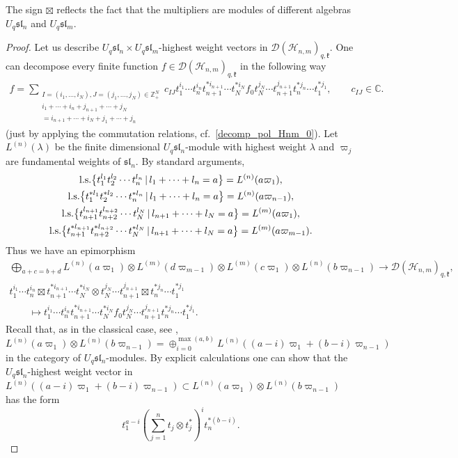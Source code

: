 \documentclass[pdftex]{sigma}
\begin{document}
\begin{remark}
The sign $\boxtimes$ ref\/lects the fact that the multipliers are modules of dif\/ferent algebras $U_q
\mathfrak{sl}_n$ and $U_q \mathfrak{sl}_m$.
\end{remark}

\begin{proof} Let us describe $U_q \mathfrak{sl}_n \times U_q \mathfrak{sl}_m$-highest weight vectors in
$\mathscr{D}(\mathscr{H}_{n,m})_{q,\mathfrak{k}}$. One can decompose every f\/inite function $f \in
\mathscr{D}(\mathscr{H}_{n,m})_{q,\mathfrak{k}}$ in the following way
\begin{gather*}
f= \sum_{\substack{I=(i_1,\ldots,i_N), J=(j_1,\ldots,j_N) \in \mathbb Z_+^N \\ i_1+\cdots +
i_n+j_{n+1}+\cdots +j_N\\ = i_{n+1}+\cdots+i_N+j_1+\cdots +j_n}} \!\!\!\!\!c_{IJ}t_1^{i_1}\cdots
t_n^{i_n}t_{n+1}^{*i_{n+1}}\cdots t_N^{*i_N}f_0t_N^{j_N}\cdots t_{n+1}^{j_{n+1}}t_n^{*j_n}\cdots t_1^{*j_1},
\qquad c_{IJ} \in \mathbb C.
\end{gather*}
(just by applying the commutation relations, cf.~\eqref{decomp_pol_Hnm_0}). Let $L^{(n)}(\lambda)$ be the
f\/inite dimensional $U_q \mathfrak{sl}_n$-module with highest weight $\lambda$ and $\varpi_j$ are fundamental
weights of $\mathfrak{sl}_n$. By standard arguments,
\begin{gather*}
 {\rm l.s.}\big\{t_1^{l_1}t_2^{l_2}\cdots t_n^{l_n}\,|\,l_1+\cdots+l_n=a\big\}=L^{(n)}(a\varpi_1),
\\  {\rm l.s.}\big\{t_1^{*l_1}t_2^{*l_2}\cdots t_n^{*l_n}\,|\,l_1+\cdots+l_n=a\big\}=L^{(n)}(a\varpi_{n-1}),
\\  {\rm l.s.}\big\{t_{n+1}^{l_{n+1}}t_{n+2}^{l_{n+2}}\cdots t_N^{l_N}\,|\, l_{n+1}+\cdots+l_N=a\big\}=L^{(m)}(a\varpi_1),
\\  {\rm l.s.}\big\{t_{n+1}^{*l_{n+1}}t_{n+2}^{*l_{n+2}}\cdots
t_N^{*l_N}\,|\,l_{n+1}+\cdots+l_N=a\big\}=L^{(m)}(a\varpi_{m-1}).
\end{gather*}
Thus we have an epimorphism
\begin{gather*}
\bigoplus_{a+c=b+d} L^{(n)}(a\varpi_1) \otimes  L^{(m)}(d\varpi_{m-1}) \otimes L^{(m)}(c\varpi_1) \otimes
L^{(n)}(b\varpi_{n-1}) \rightarrow \mathscr{D}(\mathscr{H}_{n,m})_{q,\mathfrak{k}},
\\
t_1^{i_1}\cdots t_n^{i_n} \boxtimes t_{n+1}^{*i_{n+1}}\cdots t_N^{*i_N} \otimes t_N^{j_N}\cdots
t_{n+1}^{j_{n+1}} \boxtimes t_n^{*j_n}\cdots t_1^{*j_1}\\
\qquad{} \mapsto t_1^{i_1}\cdots t_n^{i_n}
t_{n+1}^{*i_{n+1}}\cdots t_N^{*i_N}f_0t_N^{j_N}\cdots t_{n+1}^{j_{n+1}}t_n^{*j_n}\cdots t_1^{*j_1}.
\end{gather*}
Recall that, as in the classical case, see \cite{VO},
\[
L^{(n)}(a\varpi_1) \otimes L^{(n)}(b\varpi_{n-1}) = \oplus_{i=0}^{\max(a,b)}
L^{(n)}((a-i)\varpi_1+(b-i)\varpi_{n-1})
\]
in the category of $U_q \mathfrak{sl}_n$-modules. By explicit calculations one can show that the $U_q
\mathfrak{sl}_n$-highest weight vector in $L^{(n)}((a-i)\varpi_1+(b-i)\varpi_{n-1}) \subset
L^{(n)}(a\varpi_1) \otimes L^{(n)}(b\varpi_{n-1})$ has the form
\[
t_1^{a-i}  \left(\sum_{j=1}^nt_j
\otimes t_j^*\right)^{i}   t_n^{*(b-i)}.
\]


\end{proof}
\end{document}
